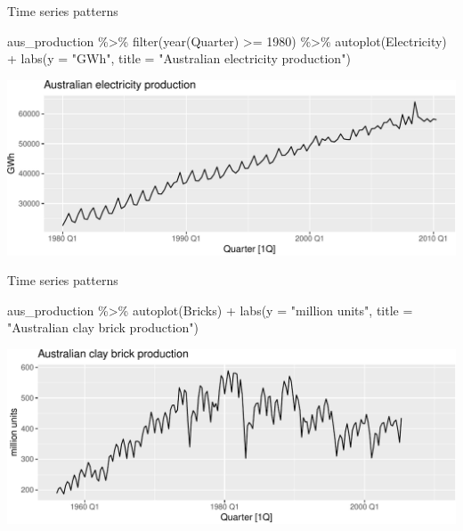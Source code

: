 \documentclass[14pt,ignorenonframetext,aspectratio=169]{beamer}
\newenvironment{Shaded}{\begin{snugshade}}{\end{snugshade}}
\newcommand{\AttributeTok}[1]{\textcolor[rgb]{0.77,0.63,0.00}{#1}}
\newcommand{\DecValTok}[1]{\textcolor[rgb]{0.00,0.00,0.81}{#1}}
\newcommand{\FunctionTok}[1]{\textcolor[rgb]{0.00,0.00,0.00}{#1}}
\newcommand{\NormalTok}[1]{#1}
\newcommand{\SpecialCharTok}[1]{\textcolor[rgb]{0.00,0.00,0.00}{#1}}
\newcommand{\StringTok}[1]{\textcolor[rgb]{0.31,0.60,0.02}{#1}}
\renewenvironment{Shaded}{\color{black}\begin{snugshade}\color{black}}{\end{snugshade}}
\renewenvironment{Shaded}{\color{black}\fontsize{10}{10}\sf\begin{snugshade}\color{black}}{\end{snugshade}}
\begin{document}
\begin{frame}[fragile]{Time series patterns}
\protect\hypertarget{time-series-patterns-1}{}
\fontsize{9}{9}\sf

\begin{Shaded}
\begin{Highlighting}[]
\NormalTok{aus\_production }\SpecialCharTok{\%\textgreater{}\%}
  \FunctionTok{filter}\NormalTok{(}\FunctionTok{year}\NormalTok{(Quarter) }\SpecialCharTok{\textgreater{}=} \DecValTok{1980}\NormalTok{) }\SpecialCharTok{\%\textgreater{}\%}
  \FunctionTok{autoplot}\NormalTok{(Electricity) }\SpecialCharTok{+}
  \FunctionTok{labs}\NormalTok{(}\AttributeTok{y =} \StringTok{"GWh"}\NormalTok{, }\AttributeTok{title =} \StringTok{"Australian electricity production"}\NormalTok{)}
\end{Highlighting}
\end{Shaded}

\includegraphics{2-tsgraphics_files/figure-beamer/unnamed-chunk-7-1.pdf}
\end{frame}

\begin{frame}[fragile]{Time series patterns}
\protect\hypertarget{time-series-patterns-2}{}
\fontsize{9}{9}\sf

\begin{Shaded}
\begin{Highlighting}[]
\NormalTok{aus\_production }\SpecialCharTok{\%\textgreater{}\%}
  \FunctionTok{autoplot}\NormalTok{(Bricks) }\SpecialCharTok{+}
  \FunctionTok{labs}\NormalTok{(}\AttributeTok{y =} \StringTok{"million units"}\NormalTok{, }\AttributeTok{title =} \StringTok{"Australian clay brick production"}\NormalTok{)}
\end{Highlighting}
\end{Shaded}

\includegraphics{2-tsgraphics_files/figure-beamer/unnamed-chunk-8-1.pdf}
\end{frame}
\end{document}
